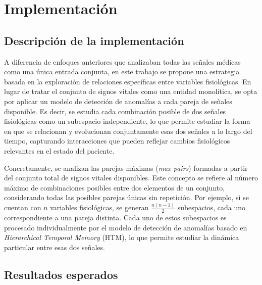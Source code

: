 \chapter{Implementación}

\section{Descripción de la implementación}

A diferencia de enfoques anteriores que analizaban todas las señales médicas como una única entrada conjunta, en este trabajo se propone una estrategia basada en la exploración de relaciones específicas entre variables fisiológicas. En lugar de tratar el conjunto de signos vitales como una entidad monolítica, se opta por aplicar un modelo de detección de anomalías a cada pareja de señales disponible. Es decir, se estudia cada combinación posible de dos señales fisiológicas como un subespacio independiente, lo que permite estudiar la forma en que se relacionan y evolucionan conjuntamente esas dos señales a lo largo del tiempo, capturando interacciones que pueden reflejar cambios fisiológicos relevantes en el estado del paciente.

Concretamente, se analizan las parejas máximas (\textit{max pairs}) formadas a partir del conjunto total de signos vitales disponibles. Este concepto se refiere al número máximo de combinaciones posibles entre dos elementos de un conjunto, considerando todas las posibles parejas únicas sin repetición. Por ejemplo, si se cuentan con $n$ variables fisiológicas, se generan $\frac{n(n-1)}{2}$ subespacios, cada uno correspondiente a una pareja distinta. Cada uno de estos subespacios es procesado individualmente por el modelo de detección de anomalías basado en \textit{Hierarchical Temporal Memory }(HTM), lo que permite estudiar la dinámica particular entre esas dos señales.

\medskip

\section{Resultados esperados}